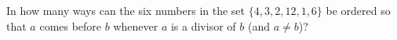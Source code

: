 In how many ways can the six numbers in the set $\{4,3,2,12,1,6\}$ be ordered so that $a$ comes before $b$ whenever $a$ is a divisor of $b$ (and $a\ne b$)?
